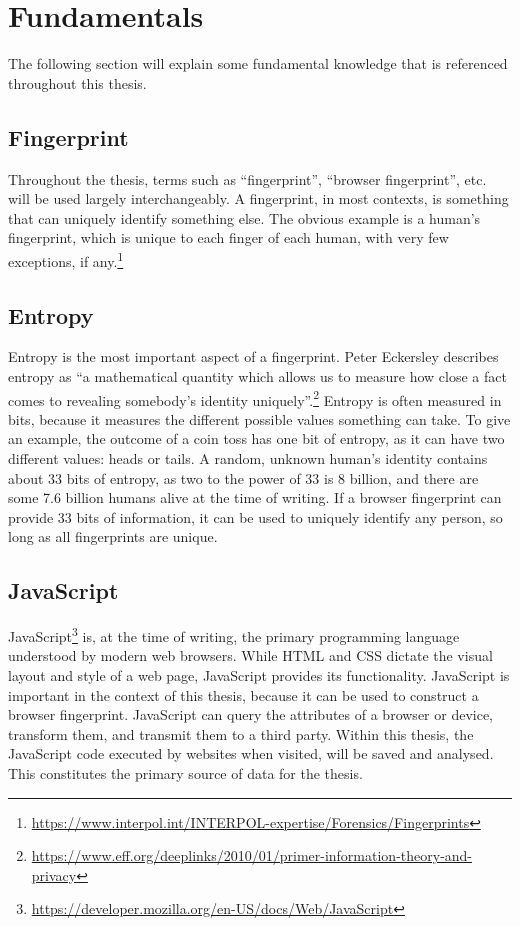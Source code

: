 \documentclass[
    fontsize=12pt,
    headings=small,
    parskip=half,
    bibliography=totoc,
    numbers=noenddot,
    open=any
    ]{scrreprt}
\begin{document}
\section{Fundamentals}
The following section will explain some fundamental knowledge that is
referenced throughout this thesis.

\subsection{Fingerprint}
\label{fundamentals:fingerprint}
Throughout the thesis, terms such as ``fingerprint'', ``browser fingerprint'', etc.
will be used largely interchangeably.
A fingerprint, in most contexts, is something that can uniquely identify something else.
The obvious example is a human's fingerprint, which is unique to each finger of each human,
with very few exceptions, if any.\footnote{\url{https://www.interpol.int/INTERPOL-expertise/Forensics/Fingerprints}}

\subsection{Entropy}
\label{fundamentals:entropy}
Entropy is the most important aspect of a fingerprint.
Peter Eckersley describes entropy as
``a mathematical quantity which allows us to measure how close a fact comes to revealing somebody's identity uniquely''.\footnote{\url{https://www.eff.org/deeplinks/2010/01/primer-information-theory-and-privacy}}
Entropy is often measured in bits, because it measures the different
possible values something can take.
To give an example, the outcome of a coin toss has one bit of entropy,
as it can have two different values: heads or tails.
A random, unknown human's identity contains about 33 bits of entropy,
as two to the power of 33 is 8 billion, and there are some 7.6 billion humans
alive at the time of writing.
If a browser fingerprint can provide 33 bits of information, it can be used
to uniquely identify any person, so long as all fingerprints are unique.

\subsection{JavaScript}
\label{fundamentals:javascript}
JavaScript\footnote{\url{https://developer.mozilla.org/en-US/docs/Web/JavaScript}} is,
at the time of writing, the primary programming language understood
by modern web browsers. While HTML and CSS dictate the visual layout and style
of a web page, JavaScript provides its functionality.
JavaScript is important in the context of this thesis, because
it can be used to construct a browser fingerprint. JavaScript can query
the attributes of a browser or device, transform them, and transmit them
to a third party.
Within this thesis, the JavaScript code executed by websites
when visited, will be saved and analysed.
This constitutes the primary source of data for the thesis.
\end{document}
